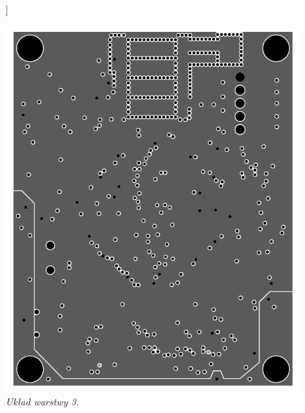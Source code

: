 \documentclass[eng,printmode]{mgr}
\begin{document}
\begin{center}\centering
\begin{figure}[!h]]

\vskip 2cm
    \centering
    
    \includegraphics[width=\textwidth]{pcb/power.png}
    \caption{\textit{Układ warstwy 3.}}
\end{figure}
\end{center}
\end{document}
